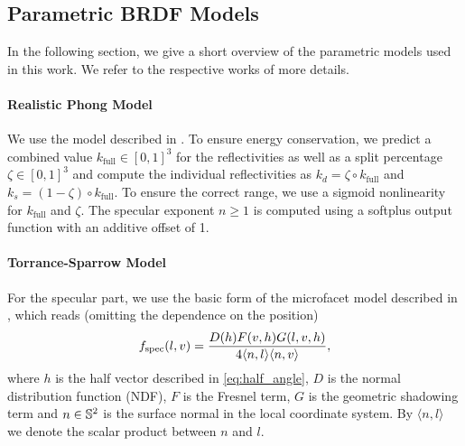 \subsection{Parametric BRDF Models}
\label{sec:supp:parametric_models}

In the following section, we give a short overview of the parametric models used in this work. We refer to the respective works of more details.

\paragraph{Realistic Phong Model}
We use the model described in \cite{lafortune1994using}. To ensure energy conservation, we predict a combined value $k_\mathrm{full}\in[0,1]^3$ for the reflectivities as well as a split percentage $\zeta\in[0,1]^3$ and compute the individual reflectivities as $k_d = \zeta\circ k_\mathrm{full}$ and $k_s = (1-\zeta)\circ k_\mathrm{full}$.
To ensure the correct range, we use a sigmoid nonlinearity for $k_\mathrm{full}$ and $\zeta$. The specular exponent $n\geq1$ is computed using a softplus output function with an additive offset of 1.

\paragraph{Torrance-Sparrow Model}
For the specular part, we use the basic form of the microfacet model described in \cite{torrance1967theory}, which reads (omitting the dependence on the position)
\begin{equation}
    f_\mathrm{spec}(l, v) = \frac{D(h)F(v, h)G(l, v, h)}{4\langle n, l\rangle\langle n, v\rangle},
\end{equation}
where $h$ is the half vector described in \cref{eq:half_angle}, $D$ is the normal distribution function (NDF), $F$ is the Fresnel term, $G$ is the geometric shadowing term and $n\in\mathbb{S}^2$ is the surface normal in the local coordinate system. By $\langle n, l\rangle$ we denote the scalar product between $n$ and $l$.

